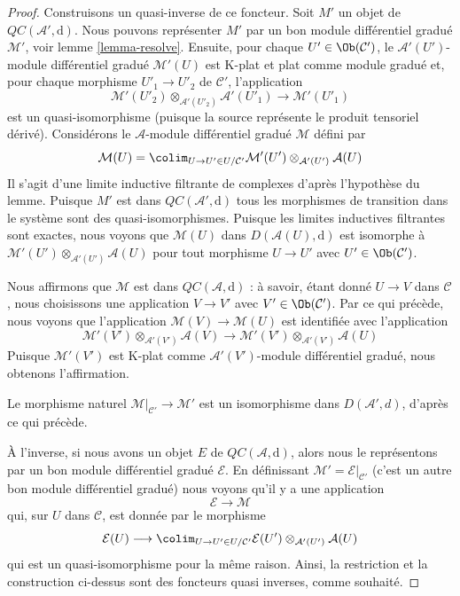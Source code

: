\begin{proof}
Construisons un quasi-inverse de ce foncteur. Soit
$M'$ un objet de $\mathit{QC}(\mathcal{A}', \text{d})$. Nous pouvons représenter
$M'$ par un bon module différentiel gradué $\mathcal{M}'$, voir lemme
\ref{lemma-resolve}. Ensuite, pour chaque $U' \in \Ob(\mathcal{C}')$, le
$\mathcal{A}'(U')$-module différentiel gradué $\mathcal{M}'(U)$ est K-plat et plat comme module
gradué et, pour chaque morphisme $U'_1 \to U'_2$ de
$\mathcal{C}'$, l'application
$$
\mathcal{M}'(U'_2) \otimes_{\mathcal{A}'(U'_2)} \mathcal{A}'(U'_1)
\longrightarrow
\mathcal{M}'(U'_1)
$$ est un
quasi-isomorphisme (puisque la source représente le produit tensoriel dérivé). Considérons
le
$\mathcal{A}$-module différentiel gradué $\mathcal{M}$ défini par
$$
\mathcal{M}(U) =
\colim_{U \to U' \in U/\mathcal{C}'}
\mathcal{M}'(U') \otimes_{\mathcal{A}'(U')} \mathcal{A}(U)
$$ Il s'agit d'une limite inductive
filtrante de complexes d'après l'hypothèse du lemme. Puisque
$M'$ est dans $\mathit{QC}(\mathcal{A}', \text{d})$ tous les morphismes de transition
dans le système sont des quasi-isomorphismes. Puisque les limites inductives
filtrantes sont exactes, nous voyons
que $\mathcal{M}(U)$ dans $D(\mathcal{A}(U), \text{d})$
est isomorphe à $\mathcal{M}'(U') \otimes_{\mathcal{A}'(U')} \mathcal{A}(U)$
pour tout morphisme $U \to U'$ avec $U' \in \Ob(\mathcal{C}')$.

\medskip\noindent
Nous affirmons que $\mathcal{M}$ est dans
$\mathit{QC}(\mathcal{A}, \text{d})$ : à savoir, étant donné $U \to V$
dans $\mathcal{C}$, nous choisissons une application $V \to V'$ avec $V' \in \Ob(\mathcal{C}')$.
Par ce qui précède, nous voyons que l'application $\mathcal{M}(V) \to \mathcal{M}(U)$
est
identifiée avec l'application $$
\mathcal{M}'(V') \otimes_{\mathcal{A}'(V')} \mathcal{A}(V)
\longrightarrow
\mathcal{M}'(V') \otimes_{\mathcal{A}'(V')} \mathcal{A}(U)
$$
Puisque $\mathcal{M'}(V')$ est
K-plat comme $\mathcal{A}'(V')$-module différentiel gradué, nous
obtenons l'affirmation.

\medskip\noindent
Le morphisme naturel $\mathcal{M}|_{\mathcal{C}'} \to \mathcal{M}'$
est un isomorphisme dans $D(\mathcal{A}', d)$, d'après ce qui précède.

\medskip\noindent À
l'inverse, si nous avons un objet $E$ de $\mathit{QC}(\mathcal{A}, \text{d})$, alors
nous le représentons par un bon module différentiel gradué $\mathcal{E}$. En
définissant $\mathcal{M}' = \mathcal{E}|_{\mathcal{C}'}$ (c'est un autre bon module
différentiel gradué) nous voyons qu'il y a une application
$$
\mathcal{E} \to \mathcal{M}
$$ qui,
sur $U$ dans $\mathcal{C}$, est donnée par le morphisme
$$
\mathcal{E}(U)
\longrightarrow
\colim_{U \to U' \in U/\mathcal{C}'}
\mathcal{E}(U') \otimes_{\mathcal{A}'(U')} \mathcal{A}(U)
$$ qui est
un quasi-isomorphisme pour la même raison. Ainsi, la restriction et la
construction ci-dessus sont des foncteurs quasi inverses, comme souhaité.
\end{proof}

